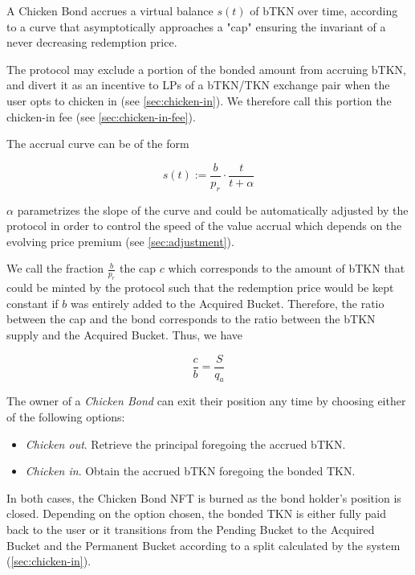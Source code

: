\documentclass{article}
\begin{document}
A Chicken Bond accrues a virtual balance $s(t)$ of bTKN over time, according to a curve that asymptotically approaches a "cap" ensuring the invariant of a never decreasing redemption price. 

The protocol may exclude a portion of the bonded amount from accruing bTKN, and divert it as an incentive to LPs of a bTKN/TKN exchange pair when the user opts to chicken in (see \ref{sec:chicken-in}). We therefore call this portion the chicken-in fee (see \ref{sec:chicken-in-fee}).

The accrual curve can be of the form 

\begin{equation}
  \label{eq:accrual}
    s(t) := \frac{b}{p_r} \cdot \frac{t}{t+\alpha}
\end{equation}


$\alpha$ parametrizes the slope of the curve and could be automatically adjusted by the protocol in order to control the speed of the value accrual which depends on the evolving price premium (see \ref{sec:adjustment}).

We call the fraction $\frac{b}{p_r}$ the cap $c$ which corresponds to the amount of bTKN that could be minted by the protocol such that the redemption price would be kept constant if $b$ was entirely added to the Acquired Bucket. Therefore, the ratio between the cap and the bond corresponds to the ratio between the bTKN supply and the Acquired Bucket. Thus, we have

\begin{equation}
  \label{eq:cap-bond-ratio}
    \frac{c}{b} = \frac{S}{q_a}
\end{equation}   

The owner of a \textit{Chicken Bond} can exit their position any time by choosing either of the following options:

\begin{itemize}
    \item \textit{Chicken out}. Retrieve the principal foregoing the accrued bTKN.
    \item \textit{Chicken in}. Obtain the accrued bTKN foregoing the bonded TKN.
\end{itemize}

In both cases, the Chicken Bond NFT is burned as the bond holder’s position is closed. Depending on the option chosen, the bonded TKN is either fully paid back to the user or it transitions from the Pending Bucket to the Acquired Bucket and the Permanent Bucket according to a split calculated by the system (\ref{sec:chicken-in}). 
\end{document}
